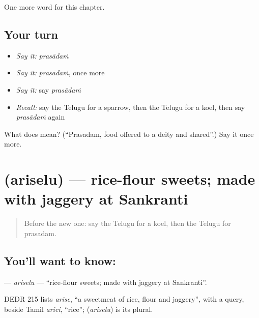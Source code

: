 \begin{grammarlens}[title={What you've built}]
One more word for this chapter.
\end{grammarlens}

\subsection*{Your turn}
\begin{itemize}
\raggedright
  \item \emph{Say it:} \emph{prasādaṁ}
  \item \emph{Say it:} \emph{prasādaṁ}, once more
  \item \emph{Say it:} say \emph{prasādaṁ}
  \item \emph{Recall:} say the Telugu for a sparrow, then the Telugu for a koel, then say \emph{prasādaṁ} again
\end{itemize}

\begin{tcolorbox}[breakable,colback=teal!4,colframe=teal!35!black,title={Before you move on}]
What does  mean? (\textquotedblleft{}Prasadam, food offered to a deity and shared\textquotedblright{}.) Say it once more.
\end{tcolorbox}
\section[\texorpdfstring{\te{అరిసెలు} (ariselu)}{అరిసెలు (ariselu)}]{ (ariselu) — rice-flour sweets; made with jaggery at Sankranti}

\label{lesson:TE-C188-ariselu}



\begin{quote}
Before the new one: say the Telugu for a koel, then the Telugu for prasadam.
\end{quote}

\subsection*{You'll want to know: }
\textbf{} — \emph{ariselu} — \textquotedblleft{}rice-flour sweets; made with jaggery at Sankranti\textquotedblright{}.

\begin{cousinweb}
DEDR 215 lists \emph{arise}, \textquotedblleft{}a sweetmeat of rice, flour and jaggery\textquotedblright{}, with a query, beside Tamil \emph{arici}, \textquotedblleft{}rice\textquotedblright{}; \textbf{} (\emph{ariselu}) is its plural.
\end{cousinweb}

